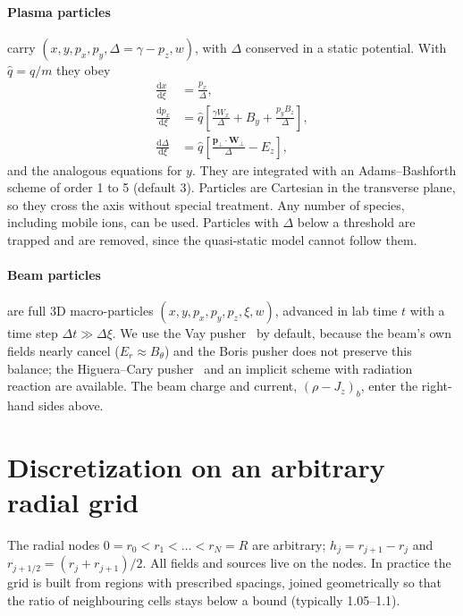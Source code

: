\documentclass[aps,prab,reprint,floatfix,superscriptaddress,amsmath,amssymb]{revtex4-2}
\newcommand{\dd}{\mathrm{d}}
\begin{document}
\paragraph{Plasma particles} carry $(x, y, p_x, p_y, \Delta = \gamma - p_z, w)$, with $\Delta$ conserved in a static potential. With $\hat q = q/m$ they obey
\begin{align}
\frac{\dd x}{\dd\xi} &= \frac{p_x}{\Delta}, \label{eq:eom}\\
\frac{\dd p_x}{\dd\xi} &= \hat q\left[\frac{\gamma W_x}{\Delta} + B_y + \frac{p_y B_z}{\Delta}\right], \\
\frac{\dd \Delta}{\dd\xi} &= \hat q\left[\frac{\bm{p}_\perp\cdot\bm{W}_\perp}{\Delta} - E_z\right],
\end{align}
and the analogous equations for $y$. They are integrated with an Adams--Bashforth scheme of order 1 to 5 (default 3). Particles are Cartesian in the transverse plane, so they cross the axis without special treatment. Any number of species, including mobile ions, can be used. Particles with $\Delta$ below a threshold are trapped and are removed, since the quasi-static model cannot follow them.

\paragraph{Beam particles} are full 3D macro-particles $(x, y, p_x, p_y, p_z, \xi, w)$, advanced in lab time $t$ with a time step $\Delta t \gg \Delta\xi$. We use the Vay pusher~\cite{Vay2008} by default, because the beam's own fields nearly cancel ($E_r\approx B_\theta$) and the Boris pusher does not preserve this balance; the Higuera--Cary pusher~\cite{Higuera2017} and an implicit scheme with radiation reaction are available. The beam charge and current, $(\rho - J_z)_b$, enter the right-hand sides above.

\section{Discretization on an arbitrary radial grid}\label{sec:disc}

The radial nodes $0 = r_0 < r_1 < \dots < r_N = R$ are arbitrary; $h_j = r_{j+1} - r_j$ and $r_{j+1/2} = (r_j + r_{j+1})/2$. All fields and sources live on the nodes. In practice the grid is built from regions with prescribed spacings, joined geometrically so that the ratio of neighbouring cells stays below a bound (typically 1.05--1.1).
\end{document}
